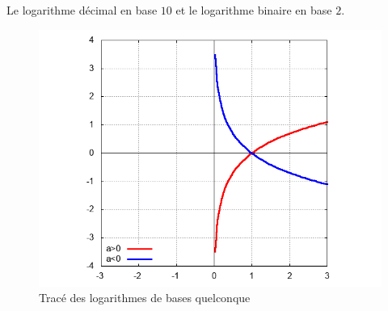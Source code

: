 Le logarithme décimal en base $10$ et le logarithme binaire en base $2$.
\begin{figure}
  \centering
  \includegraphics[scale=0.4,angle=-90]{logbase.png}
  \caption{Tracé des logarithmes de bases quelconque}
  \label{fig:traceloga}
\end{figure}
